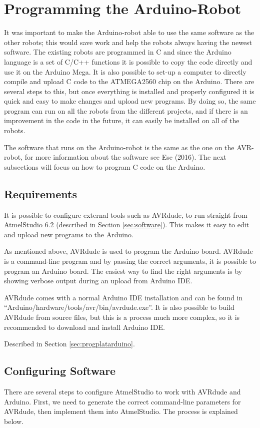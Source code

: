 \section{Programming the Arduino-Robot}
\label{sec:programardu}
It was important to make the Arduino-robot able to use the same software as the other robots; this would save work and help the robots always having the newest software. The existing robots are programmed in C and since the Arduino language is a set of C/C++ functions it is possible to copy the code directly and use it on the Arduino Mega. It is also possible to set-up a computer to directly compile and upload C code to the ATMEGA2560 chip on the Arduino. There are several steps to this, but once everything is installed and properly configured it is quick and easy to make changes and upload new programs. By doing so, the same program can run on all the robots from the different projects, and if there is an improvement in the code in the future, it can easily be installed on all of the robots.

The software that runs on the Arduino-robot is the same as the one on the AVR-robot, for more information about the software see Ese (2016). The next subsections will focus on how to program C code on the Arduino.

\subsection{Requirements}
It is possible to configure external tools such as AVRdude, to run straight from AtmelStudio 6.2 (described in Section \ref{sec:software}). This makes it easy to edit and upload new programs to the Arduino.

As mentioned above, AVRdude is used to program the Arduino board. AVRdude is a command-line program and by passing the correct arguments, it is possible to program an Arduino board. The easiest way to find the right arguments is by showing verbose output during an upload from Arduino IDE.

AVRdude comes with a normal Arduino IDE installation and can be found in ``Arduino/hardware/tools/avr/bin/avrdude.exe''. It is also possible to build AVRdude from source files, but this is a process much more complex, so it is recommended to download and install Arduino IDE.

Described in Section \ref{sec:progplatarduino}.

\newpage
\subsection{Configuring Software}
\label{sec:configSoftware}
There are several steps to configure AtmelStudio to work with AVRdude and Arduino. First, we need to generate the correct command-line parameters for AVRdude, then implement them into AtmelStudio. The process is explained below.

